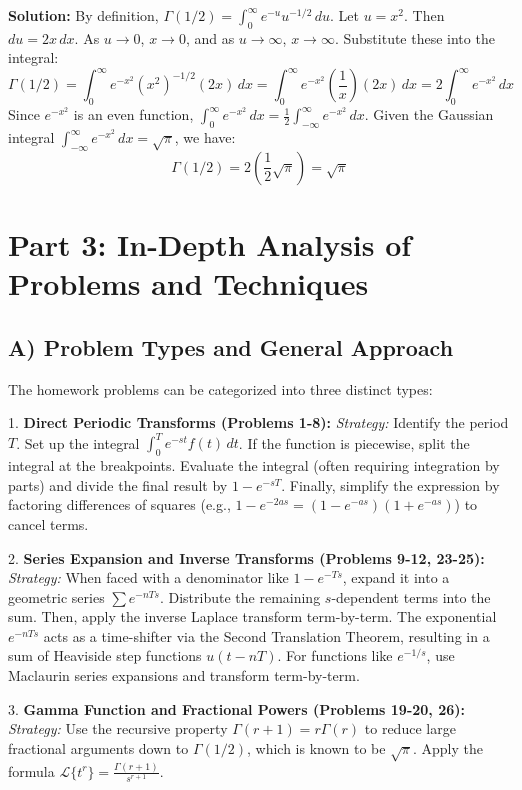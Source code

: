 \documentclass[11pt, letterpaper]{article}
\theoremstyle{definition}
\theoremstyle{remark}
\begin{document}
\textbf{Solution:}
By definition, $\Gamma(1/2) = \int_0^\infty e^{-u} u^{-1/2} \, du$.
Let $u = x^2$. Then $du = 2x \, dx$. As $u \to 0$, $x \to 0$, and as $u \to \infty$, $x \to \infty$.
Substitute these into the integral:
\[ \Gamma(1/2) = \int_0^\infty e^{-x^2} (x^2)^{-1/2} (2x) \, dx = \int_0^\infty e^{-x^2} \left(\frac{1}{x}\right) (2x) \, dx = 2 \int_0^\infty e^{-x^2} \, dx \]
Since $e^{-x^2}$ is an even function, $\int_0^\infty e^{-x^2} \, dx = \frac{1}{2} \int_{-\infty}^\infty e^{-x^2} \, dx$.
Given the Gaussian integral $\int_{-\infty}^\infty e^{-x^2} \, dx = \sqrt{\pi}$, we have:
\[ \Gamma(1/2) = 2 \left( \frac{1}{2} \sqrt{\pi} \right) = \sqrt{\pi} \]

\newpage
\section{Part 3: In-Depth Analysis of Problems and Techniques}

\subsection{A) Problem Types and General Approach}
The homework problems can be categorized into three distinct types:

1. \textbf{Direct Periodic Transforms (Problems 1-8):}
   \textit{Strategy:} Identify the period $T$. Set up the integral $\int_0^T e^{-st} f(t) \, dt$. If the function is piecewise, split the integral at the breakpoints. Evaluate the integral (often requiring integration by parts) and divide the final result by $1 - e^{-sT}$. Finally, simplify the expression by factoring differences of squares (e.g., $1 - e^{-2as} = (1 - e^{-as})(1 + e^{-as})$) to cancel terms.

2. \textbf{Series Expansion and Inverse Transforms (Problems 9-12, 23-25):}
   \textit{Strategy:} When faced with a denominator like $1 - e^{-Ts}$, expand it into a geometric series $\sum e^{-nTs}$. Distribute the remaining $s$-dependent terms into the sum. Then, apply the inverse Laplace transform term-by-term. The exponential $e^{-nTs}$ acts as a time-shifter via the Second Translation Theorem, resulting in a sum of Heaviside step functions $u(t-nT)$. For functions like $e^{-1/s}$, use Maclaurin series expansions and transform term-by-term.

3. \textbf{Gamma Function and Fractional Powers (Problems 19-20, 26):}
   \textit{Strategy:} Use the recursive property $\Gamma(r+1) = r\Gamma(r)$ to reduce large fractional arguments down to $\Gamma(1/2)$, which is known to be $\sqrt{\pi}$. Apply the formula $\mathcal{L}\{t^r\} = \frac{\Gamma(r+1)}{s^{r+1}}$.
\end{document}
